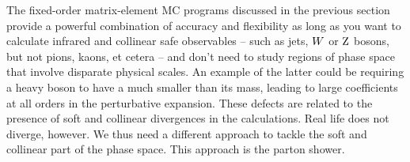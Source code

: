 


The fixed-order matrix-element MC programs discussed in the previous section provide a powerful
combination of accuracy and flexibility as long as you want to calculate infrared and collinear safe
observables -- such as jets, $W$ or $\mathrm{Z}$ bosons, but not pions, kaons, et cetera -- and
don’t need to study regions of phase space that involve disparate physical scales. An example of
the latter could be requiring a heavy boson to have a \pt much smaller than its mass, leading to
large coefficients at all orders in the perturbative expansion.
These defects are related to the presence of soft and collinear divergences in the calculations.
Real life does not diverge, however. We thus need a different approach to tackle the soft and
collinear part of the phase space. This approach is the parton shower. 

